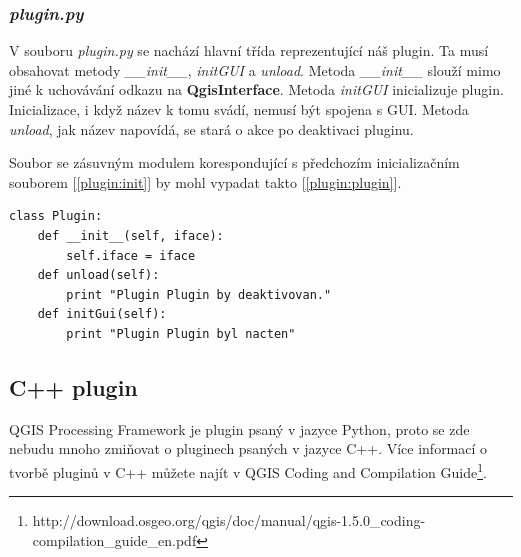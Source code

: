 \subsubsection*{\textit{plugin.py}}
V souboru \textit{plugin.py} se nachází hlavní třída reprezentující
náš plugin. Ta musí obsahovat
metody \textit{\_\_init\_\_}, \textit{initGUI}
a \textit{unload}. Metoda \textit{\_\_init\_\_} slouží mimo jiné k
uchovávání odkazu na \textbf{QgisInterface}. Metoda \textit{initGUI}
inicializuje plugin. Inicializace, i když název k tomu svádí, nemusí
být spojena s GUI. Metoda \textit{unload}, jak název napovídá, se
stará o akce po deaktivaci pluginu.

\newpage
Soubor se zásuvným modulem korespondující s předchozím inicializačním
souborem [\autoref{plugin:init}] by mohl vypadat takto
[\autoref{plugin:plugin}]. \\

\begin{lstlisting}[caption={plugin.py - plugin},label=plugin:plugin]
class Plugin:
    def __init__(self, iface):
        self.iface = iface
    def unload(self):
        print "Plugin Plugin by deaktivovan."
    def initGui(self):
		print "Plugin Plugin byl nacten"
\end{lstlisting}

\subsection{C++ plugin}
QGIS Processing Framework je plugin psaný v jazyce Python, proto se
zde nebudu mnoho zmiňovat o pluginech psaných v jazyce C++. Více
informací o tvorbě pluginů v C++ můžete najít v QGIS Coding and
Compilation
Guide\footnote{http://download.osgeo.org/qgis/doc/manual/qgis-1.5.0\_coding-compilation\_guide\_en.pdf}.
%
